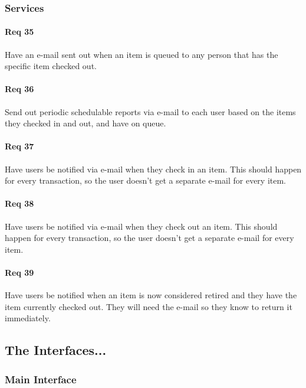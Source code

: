 \documentclass[10pt, onecolumn, twoside, peerreview]{IEEEtran}
\begin{document}
\subsubsection{Services}
\paragraph*{Req 35} Have an e-mail sent out when an item is queued to any person that has the specific item checked out.\\

\paragraph*{Req 36} Send out periodic schedulable reports via e-mail to each user based on the items they checked in and out, and have on
queue.\\

\paragraph*{Req 37} Have users be notified via e-mail when they check in an item. This should happen for every transaction, so the user
doesn't get a separate e-mail for every item.\\

\paragraph*{Req 38} Have users be notified via e-mail when they check out an item. This should happen for every transaction, so the user
doesn't get a separate e-mail for every item.\\

\paragraph*{Req 39} Have users be notified when an item is now considered retired and they have the item currently checked out. They will
need the e-mail so they know to return it immediately.\\

\subsection{The Interfaces...}
\subsubsection{Main Interface}
\end{document}
